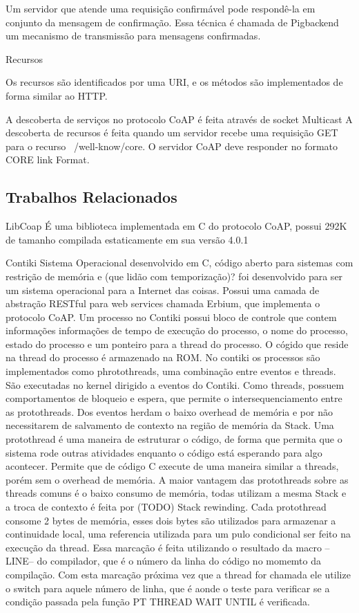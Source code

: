 Um servidor que atende uma requisição confirmável pode respondê-la em conjunto da mensagem de confirmação. Essa técnica é chamada de Pigbackend um mecanismo de transmissão para mensagens confirmadas.\cite{draft-ietf-core-coap-18}

Recursos

Os recursos são identificados por uma URI, e os métodos são implementados de forma similar ao HTTP.

A descoberta de serviços no protocolo CoAP é feita através de socket Multicast
A descoberta de recursos é feita quando um servidor recebe uma requisição GET para o recurso ~/well-know/core. O servidor CoAP deve responder no formato CORE link Format.\cite{rfc6690}

\subsection{Trabalhos Relacionados}

LibCoap É uma biblioteca implementada em C do protocolo CoAP, possui 292K de tamanho compilada estaticamente em sua versão 4.0.1

Contiki Sistema Operacional desenvolvido em C, código aberto para sistemas com restrição de memória e (que lidão com temporização)? foi desenvolvido para ser um sistema operacional para a Internet das coisas. Possui uma camada de abstração RESTful para web services chamada Erbium, que implementa o protocolo CoAP.
Um processo no Contiki possui bloco de controle que contem informações informações de tempo de execução do processo, o nome do processo, estado do processo e um ponteiro para a thread do processo. O cógido que reside na thread do processo é armazenado na ROM.
No contiki os processos são implementados como phrotothreads, uma combinação entre eventos e threads. São executadas no kernel dirigido a eventos do Contiki. Como threads, possuem comportamentos de bloqueio e espera, que permite o intersequenciamento entre as protothreads. Dos eventos herdam o baixo overhead de memória e por não necessitarem de salvamento de contexto na região de memória da Stack.
Uma protothread é uma maneira de estruturar o código, de forma que permita que o sistema rode outras atividades enquanto o código está esperando para algo acontecer. Permite que de código C execute de uma maneira similar a threads, porém sem o overhead de memória.
A maior vantagem das protothreads sobre as threads comuns é o baixo consumo de memória, todas utilizam a mesma Stack e a troca de contexto é feita por (TODO) Stack rewinding. Cada protothread consome 2 bytes de memória, esses dois bytes são utilizados para armazenar a continuidade local, uma referencia utilizada para um pulo condicional ser feito na execução da thread. Essa marcação é feita utilizando o resultado da macro --LINE-- do compilador, que é o número da linha do código no momemto da compilação. Com esta marcação próxima vez que a thread for chamada ele utilize o switch para aquele número de linha, que é aonde o teste para verificar se a condição passada pela função PT THREAD WAIT UNTIL é verificada.

